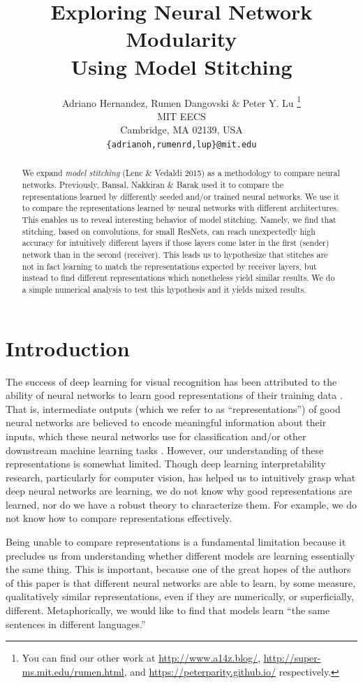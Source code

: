 \documentclass{article} %
\title{Exploring Neural Network Modularity \\ Using Model Stitching}
\author{Adriano Hernandez, Rumen Dangovski \& Peter Y. Lu \thanks{You can find our other work at \url{http://www.a14z.blog/}, \url{http://super-ms.mit.edu/rumen.html}, and \url{https://peterparity.github.io/} respectively.} \\
MIT EECS\\
Cambridge, MA 02139, USA \\
\texttt{\{adrianoh,rumenrd,lup\}@mit.edu}
}
\begin{document}
\maketitle

\begin{abstract}
We expand \textit{model stitching} (Lenc \& Vedaldi 2015) as a methodology to compare neural networks.
Previously, Bansal, Nakkiran \& Barak used it to compare the representations learned by differently seeded
and/or trained neural networks.
We use it to compare the representations learned by neural networks with different architectures.
This enables us to reveal interesting behavior of model stitching. Namely, we find that stitching, 
based on convolutions, for small ResNets, can reach unexpectedly
high accuracy for intuitively different layers if those layers come later in the first (sender) network than in
the second (receiver). This leads us to hypothesize that stitches are not in fact learning to match the
representations expected by receiver layers, but instead to find different representations which nonetheless
yield similar results.
We do a simple numerical analysis to test this hypothesis and it yields mixed results.
\end{abstract}

\section{Introduction}
\label{Introduction}
The success of deep learning for visual recognition has been attributed to the ability of neural networks to learn
good representations of their training data \cite{Rumelhart1986LearningIR}. That is, intermediate outputs (which we refer
to as ``representations'') of good neural networks 
are believed to encode meaningful information about their inputs, which these neural networks use for classification and/or other
downstream machine learning tasks \cite{goodfellow2016deep}.
However, our understanding of these representations is somewhat limited. Though
deep learning interpretability research, particularly for computer vision, has helped us
to intuitively grasp what deep neural 
networks are learning, we do not
know why good representations are learned, nor do we have a robust theory to characterize them. For example, we do not
know how to compare representations effectively.

Being unable to compare representations is a fundamental limitation because it precludes us from understanding whether
different models are learning essentially the same thing. This is important, because one of the great hopes of the authors
of this paper is that
different neural networks are able to learn, by some measure, qualitatively similar representations, even if they are
numerically, or superficially, different. Metaphorically,
we would like to find that models learn ``the same sentences in different languages.''
\end{document}
